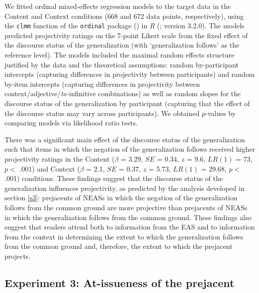 \documentclass[11pt,fleqn]{article}
\newcommand{\6}{\mbox{$[\hspace*{-.6mm}[$}}
\newcommand{\9}{\mbox{$]\hspace*{-.6mm}]$}}
\begin{document}
We fitted ordinal mixed-effects regression models to the target data in the Content and Context conditions (668 and 672 data points, respectively), using the {\tt clmm} function of the {\tt ordinal} package (\citealt{Christensen2013}) in {\em R} (\citealt{r}; version 3.2.0). The models predicted projectivity ratings on the 7-point Likert scale from the fixed effect of the discourse status of the generalization (with `generalization follows' as the reference level). The models included the maximal random effects structure justified by the data and the theoretical assumptions: random by-participant intercepts (capturing differences in projectivity between participants) and random by-item intercepts (capturing differences in projectivity between context/adjective/{\em to-}infinitive combinations) as well as random slopes for the discourse status of the generalization by participant  (capturing that the effect of the discourse status may vary across participants). We obtained $p$-values by comparing models via likelihood ratio tests.

There was a significant main effect of the discourse status of the generalization such that items in which the negation of the generalization follows received higher projectivity ratings in the Content ($\beta$ = 3.29, $SE$ = 0.34, $z$ = 9.6, $LR(1)$ = 73, $p <$ .001) and Context ($\beta$ = 2.1, $SE$ = 0.37, $z$ = 5.73, $LR(1)$ = 29.68, $p <$ .001) conditions. These findings suggest that the discourse status of the generalization influences projectivity, as predicted by the analysis developed in section \ref{s3}: prejacents of NEASs in which the negation of the generalization follows from the common ground are more projective than prejacents of NEASs in which the generalization follows from the common ground. These findings also suggest that readers attend both to information from the EAS and to information from the context in determining the extent to which the generalization follows from the common ground and, therefore, the extent to which the prejacent projects.

\subsection{Experiment 3: At-issueness of the prejacent}\label{s43}
\end{document}
